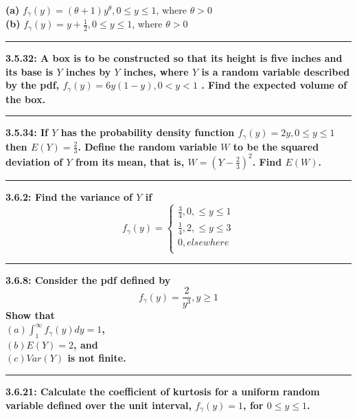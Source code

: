 \documentclass[11pt]{article}
\newcommand\question[2]{\vspace{.25in}\hrule\textbf{#1: #2}\vspace{.5em}\vspace{.10in}}
\renewcommand\part[1]{\vspace{.10in}\textbf{(#1)}}
\begin{document}
\part{a} $f_{\gamma} (y) = (\theta + 1)y^{\theta}, 0 \leq y \leq 1$, where $\theta > 0$
\\ 
\part{b} $f_{\gamma} (y) = y + \frac{1}{2}, 0 \leq y \leq 1$, where $\theta > 0$


\question{3.5.32}
{A box is to be constructed so that its height is five inches and its base is
$Y$ inches by $Y$ inches, where $Y$ is a random variable described by the pdf,
$f_{\gamma}(y) = 6y(1-y),0 < y < 1$
. Find the expected volume of the box.}


\question{3.5.34}
{If $Y$ has the probability density function 
$f_{\gamma} (y) = 2y, 0 \leq y \leq 1$
then $E(Y) = \frac{2}{3}$. Define the random variable $W$ to be the squared deviation
of $Y$ from its mean, that is, $W = (Y-\frac{2}{3})^{2}$. Find $E(W)$.}


\question{3.6.2}
{Find the variance of $Y$ if 
\[
    f_{\gamma} (y) =
        \begin{cases}
            \frac{3}{4}, 0, \leq y \leq 1 \\
            \frac{1}{4}, 2, \leq y \leq 3 \\
            0, elsewhere \\
        \end{cases}
\]}


\question{3.6.8}
{Consider the pdf defined by 
    \[
        f_{\gamma}(y) = \frac{2}{y^{3}}, y \geq 1
    \]
Show that \\
$(a) \int_{1}^{\infty} f_{\gamma}(y) dy = 1$, \\
$(b) E(Y) = 2$, and \\
$(c) Var(Y)$ is not finite.
}


\question{3.6.21}
{Calculate the coefficient of kurtosis for a uniform random variable defined
over the unit interval, $f_{\gamma}(y) = 1$, for $0 \leq y \leq 1$. }
\end{document}

